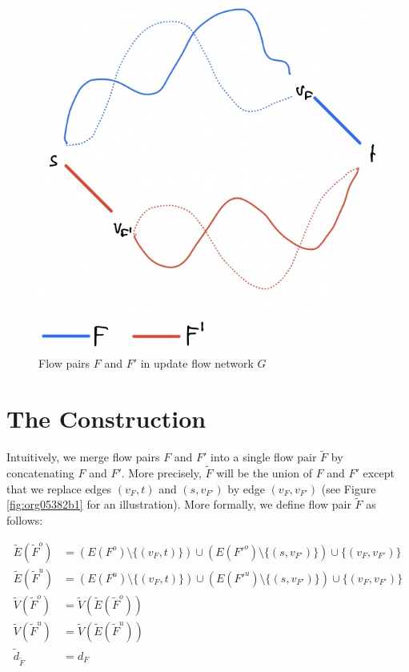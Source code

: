 \documentclass[fontsize=11pt,paper=a4]{book}
\begin{document}
\begin{figure}[htbp]
\centering
\includegraphics[width=.9\linewidth]{../assets/Screen Shot 2023-02-19 at 13.28.41.png}
\caption{\label{fig:orgc5e9c90}Flow pairs \(F\) and \(F'\) in update flow network \(G\)}
\end{figure}

\section{The Construction}
\label{sec:org1cb7f8f}

Intuitively, we merge flow pairs \(F\) and \(F'\) into a single flow pair \(\tilde{F}\) by concatenating \(F\) and \(F'\).
More precisely, \(\tilde{F}\) will be the union of \(F\) and \(F'\) except that we replace edges \((v_F,t)\) and \((s,v_{F'})\) by edge \((v_F,v_{F'})\) (see Figure \ref{fig:org05382b1} for an illustration).
More formally, we define flow pair \(\tilde{F}\) as follows:

\begin{align*}
\tilde{E}(\tilde{F}^o)&=\left(E(F^o)\setminus\{(v_F,t)\}\right)\cup\left(E(F'^o)\setminus\{(s,v_{F'})\}\right)\cup\{(v_F,v_{F'})\}\\
\tilde{E}(\tilde{F}^u)&=\left(E(F^u)\setminus\{(v_F,t)\}\right)\cup\left(E(F'^u)\setminus\{(s,v_{F'})\}\right)\cup\{(v_F,v_{F'})\}\\
\tilde{V}(\tilde{F}^o)&=\tilde{V}(\tilde{E}(\tilde{F}^o))\\
\tilde{V}(\tilde{F}^u)&=\tilde{V}(\tilde{E}(\tilde{F}^u))\\
\tilde{d}_{\tilde{F}}&=d_F
\end{align*}
\end{document}
